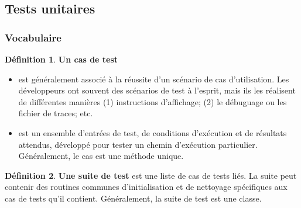 \documentclass[french]{article}
\theoremstyle{definition}
\newtheorem{definition}{Définition}[section]
\begin{document}
\subsection{Tests unitaires}

\subsubsection{Vocabulaire}
\theoremstyle{definition}
\begin{definition}{ \textbf{Un cas de test}}
\begin{itemize}
  \item  est généralement associé à la réussite d'un scénario de cas d'utilisation. Les développeurs ont souvent des scénarios de test à l'esprit, mais ils les réalisent de différentes manières (1) instructions d'affichage; (2) le débuguage ou les fichier de traces; etc.

 \item  est un ensemble d'entrées de test, de conditions d'exécution et de résultats attendus, développé pour tester un chemin d'exécution particulier. Généralement, le cas est une méthode unique.
 \end{itemize}
 \end{definition}

\begin{definition}{ \textbf{Une suite de test}}
 est une liste de cas de tests liés. La suite peut contenir des routines communes d'initialisation et de nettoyage spécifiques aux cas de tests qu'il contient. Généralement, la suite de test est une classe.
 \end{definition}
\end{document}
